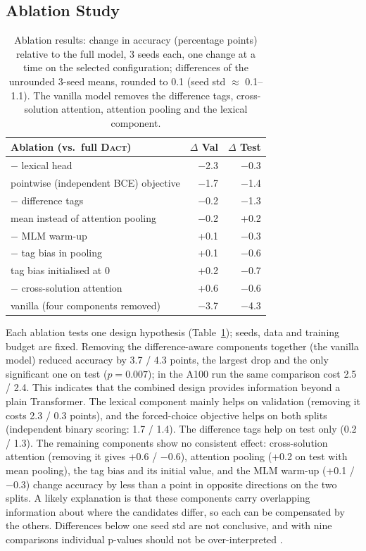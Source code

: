 \documentclass[11pt]{article}
\newcommand{\dact}{\textsc{Dact}}
\begin{document}
\subsection{Ablation Study}\label{sec:ablation}
\begin{table}[t]
\centering\small
\begin{tabular}{@{}lrr@{}}
\toprule
Ablation (vs.\ full \dact{}) & $\Delta$ Val & $\Delta$ Test \\
\midrule
$-$ lexical head & $-$2.3 & $-$0.3 \\
pointwise (independent BCE) objective & $-$1.7 & $-$1.4 \\
$-$ difference tags & $-$0.2 & $-$1.3 \\
mean instead of attention pooling & $-$0.2 & +0.2 \\
$-$ MLM warm-up & +0.1 & $-$0.3 \\
$-$ tag bias in pooling & +0.1 & $-$0.6 \\
tag bias initialised at 0 & +0.2 & $-$0.7 \\
$-$ cross-solution attention & +0.6 & $-$0.6 \\
\midrule
vanilla (four components removed) & $-$3.7 & $-$4.3 \\
\bottomrule
\end{tabular}
\caption{Ablation results: change in accuracy (percentage points) relative to the full model, 3 seeds each, one change at a time on the selected configuration; differences of the unrounded 3-seed means, rounded to 0.1 (seed std $\approx$ 0.1--1.1). The vanilla model removes the difference tags, cross-solution attention, attention pooling and the lexical component.}
\label{tab:abl}
\end{table}

Each ablation tests one design hypothesis (Table~\ref{tab:abl}); seeds, data and training budget are fixed. Removing the difference-aware components together (the vanilla model) reduced accuracy by 3.7 / 4.3 points, the largest drop and the only significant one on test ($p{=}0.007$); in the A100 run the same comparison cost 2.5 / 2.4. This indicates that the combined design provides information beyond a plain Transformer. The lexical component mainly helps on validation (removing it costs 2.3 / 0.3 points), and the forced-choice objective helps on both splits (independent binary scoring: 1.7 / 1.4). The difference tags help on test only (0.2 / 1.3). The remaining components show no consistent effect: cross-solution attention (removing it gives +0.6 / $-$0.6), attention pooling (+0.2 on test with mean pooling), the tag bias and its initial value, and the MLM warm-up (+0.1 / $-$0.3) change accuracy by less than a point in opposite directions on the two splits. A likely explanation is that these components carry overlapping information about where the candidates differ, so each can be compensated by the others. Differences below one seed std are not conclusive, and with nine comparisons individual p-values should not be over-interpreted \cite{dror2018hitchhiker}.
\end{document}
